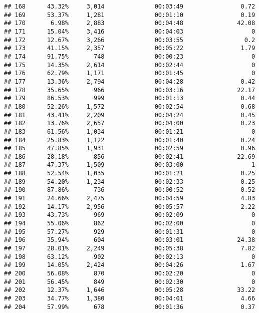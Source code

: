 \documentclass[
]{article}
\begin{document}
\begin{verbatim}
## 168      43.32%     3,014              00:03:49                0.72
## 169      53.37%     1,281              00:01:10                0.19
## 170       6.98%     2,883              00:04:48               42.08
## 171      15.04%     3,416              00:04:03                   0
## 172      12.67%     3,266              00:03:55                 0.2
## 173      41.15%     2,357              00:05:22                1.79
## 174      91.75%       748              00:00:23                   0
## 175      14.35%     2,614              00:02:44                   0
## 176      62.79%     1,171              00:01:45                   0
## 177      13.36%     2,794              00:04:28                0.42
## 178      35.65%       966              00:03:16               22.17
## 179      86.53%       999              00:01:13                0.44
## 180      52.26%     1,572              00:02:54                0.68
## 181      43.41%     2,209              00:04:24                0.45
## 182      13.76%     2,657              00:04:00                0.23
## 183      61.56%     1,034              00:01:21                   0
## 184      25.83%     1,122              00:01:40                0.24
## 185      47.85%     1,931              00:02:59                0.96
## 186      28.18%       856              00:02:41               22.69
## 187      47.37%     1,509              00:03:00                   1
## 188      52.54%     1,035              00:01:21                0.25
## 189      54.20%     1,234              00:02:33                0.25
## 190      87.86%       736              00:00:52                0.52
## 191      24.66%     2,475              00:04:59                4.83
## 192      14.17%     2,956              00:05:57                2.22
## 193      43.73%       969              00:02:09                   0
## 194      55.06%       862              00:02:00                   0
## 195      57.27%       929              00:01:31                   0
## 196      35.94%       604              00:03:01               24.38
## 197      28.01%     2,249              00:05:38                7.82
## 198      63.12%       902              00:02:13                   0
## 199      14.05%     2,424              00:04:26                1.67
## 200      56.08%       870              00:02:20                   0
## 201      56.45%       849              00:02:30                   0
## 202      12.37%     1,646              00:05:28               33.22
## 203      34.77%     1,380              00:04:01                4.66
## 204      57.99%       678              00:01:36                0.37

\end{verbatim}
\end{document}
